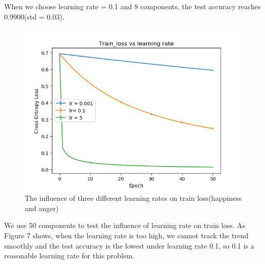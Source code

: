 \documentclass{article} %
\begin{document}
When we choose learning rate = 0.1 and 8 components, the test accuracy reaches 0.9900(std = 0.03).\\
\begin{figure}[h]
	\centering
	\includegraphics[scale=0.5]{./graph/diff_lr.png}
	\caption{The influence of three different learning rates on train loss(happiness and anger)}
\end{figure}
We use 50 components to test the influence of learning rate on train loss. As Figure 7 shows, when the learning rate is too high, we cannot track the trend smoothly and the test accuracy is the lowest under learning rate 0.1, so 0.1 is a reasonable learning rate for this problem.
\end{document}
